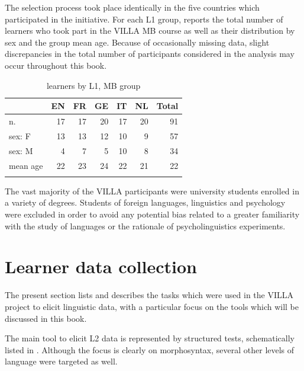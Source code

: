 The selection process took place identically in the five countries which participated in the initiative. For each L1 group,  reports the total number of learners who took part in the VILLA MB course as well as their distribution by sex and the group mean age. Because of occasionally missing data, slight discrepancies in the total number of participants considered in the analysis may occur throughout this book.

\begin{table}
    \begin{tabularx}{\textwidth}{Xrrrrrr}
    \lsptoprule
         & EN & FR & GE & IT & NL & Total\\
    \midrule
        n. & 17 & 17 & 20 & 17 & 20 & 91\\
        sex: F & 13 & 13 & 12 & 10 & 9 & 57\\
        sex: M & 4 & 7 & 5 & 10 & 8 & 34\\
        mean age & 22 & 23 & 24 & 22 & 21 & 22\\
    \lspbottomrule
    \end{tabularx}
    \caption{learners by L1, MB group}
    \label{tab:02:8}
\end{table}

The vast majority of the VILLA participants were university students enrolled in a variety of degrees. Students of foreign languages, linguistics and psychology were excluded in order to avoid any potential bias related to a greater familiarity with the study of languages or the rationale of psycholinguistics experiments.

\section{Learner data collection}\label{sec:02:4}

The present section lists and describes the tasks which were used in the VILLA project to elicit linguistic data, with a particular focus on the tools which will be discussed in this book.

The main tool to elicit L2 data is represented by structured tests, schematically listed in . Although the focus is clearly on morphosyntax, several other levels of language were targeted as well.

